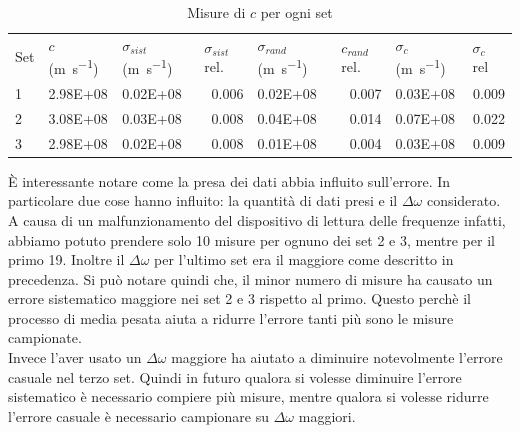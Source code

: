 \documentclass[a4paper,11pt]{article}
\begin{document}
	\begin{table}[htbp]
		\centering
		\caption{Misure di $ c $ per ogni set}
		\begin{tabular}{lllrlrlr}
			\rowcolor[rgb]{ .741,  .843,  .933} Set   & $c$ (\si{\meter\per\second})   & $\sigma_{sist}$ (\si{\meter\per\second})& \multicolumn{1}{l}{$\sigma_{sist}$ rel.} & $\sigma_{rand}$ (\si{\meter\per\second}) & \multicolumn{1}{l}{$c_{rand}$ rel.} & $\sigma_c$ (\si{\meter\per\second}) & \multicolumn{1}{l}{$\sigma_c$ rel} \\
			\rowcolor[rgb]{ .741,  .843,  .933} 1 & \cellcolor[rgb]{ .859,  .859,  .859} \num{2.98E+08} & \cellcolor[rgb]{ .859,  .859,  .859} \num{0.02E+08} & \cellcolor[rgb]{ .859,  .859,  .859} 0.006 & \cellcolor[rgb]{ .859,  .859,  .859} \num{0.02E+08} & \cellcolor[rgb]{ .859,  .859,  .859} 0.007 & \cellcolor[rgb]{ .859,  .859,  .859} \num{0.03E+08} & \cellcolor[rgb]{ .859,  .859,  .859} 0.009 \\
			\rowcolor[rgb]{ .741,  .843,  .933} 2 & \cellcolor[rgb]{ .929,  .929,  .929} \num{3.08E+08} & \cellcolor[rgb]{ .929,  .929,  .929} \num{0.03E+08} & \cellcolor[rgb]{ .929,  .929,  .929} 0.008 & \cellcolor[rgb]{ .929,  .929,  .929} \num{0.04E+08} & \cellcolor[rgb]{ .929,  .929,  .929} 0.014 & \cellcolor[rgb]{ .929,  .929,  .929} \num{0.07E+08} & \cellcolor[rgb]{ .929,  .929,  .929} 0.022 \\
			\rowcolor[rgb]{ .741,  .843,  .933} 3 & \cellcolor[rgb]{ .859,  .859,  .859} \num{2.98E+08} & \cellcolor[rgb]{ .859,  .859,  .859} \num{0.02E+08} & \cellcolor[rgb]{ .859,  .859,  .859} 0.008 & \cellcolor[rgb]{ .859,  .859,  .859} \num{0.01E+08} & \cellcolor[rgb]{ .859,  .859,  .859} 0.004 & \cellcolor[rgb]{ .859,  .859,  .859} \num{0.03E+08} & \cellcolor[rgb]{ .859,  .859,  .859} 0.009 \\
		\end{tabular}%
		\label{tab:setc}%
	\end{table}%
	È interessante notare come la presa dei dati abbia influito sull'errore. In particolare due cose hanno influito: la quantità di dati presi e il $ \Delta\omega $ considerato. A causa di un malfunzionamento del dispositivo di lettura delle frequenze infatti, abbiamo potuto prendere solo \num{10} misure per ognuno dei set 2 e 3, mentre per il primo 19. Inoltre il $ \Delta\omega $ per l'ultimo set era il maggiore come descritto in precedenza. Si può notare quindi che, il minor numero di misure ha causato un errore sistematico maggiore nei set 2 e 3 rispetto al primo. Questo perchè il processo di media pesata aiuta a ridurre l'errore tanti più sono le misure campionate. \\
	Invece l'aver usato un $ \Delta\omega $ maggiore ha aiutato a diminuire notevolmente l'errore casuale nel terzo set. Quindi in futuro qualora si volesse diminuire l'errore sistematico è necessario compiere più misure, mentre qualora si volesse ridurre l'errore casuale è necessario campionare su $ \Delta\omega $ maggiori.
	
\end{document}
